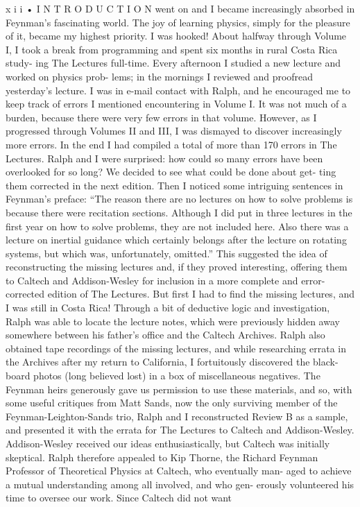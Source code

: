 \documentclass[10pt,oneside]{article}
\begin{document}
x i i • I N T R O D U C T I O N went on and I became increasingly absorbed in Feynman’s fascinating world. The joy of learning physics, simply for the pleasure of it, became my highest priority. I was hooked! About halfway through Volume I, I took a break from programming and spent six months in rural Costa Rica study- ing The Lectures full-time. Every afternoon I studied a new lecture and worked on physics prob- lems; in the mornings I reviewed and proofread yesterday’s lecture. I was in e-mail contact with Ralph, and he encouraged me to keep track of errors I mentioned encountering in Volume I. It was not much of a burden, because there were very few errors in that volume. However, as I progressed through Volumes II and III, I was dismayed to discover increasingly more errors. In the end I had compiled a total of more than 170 errors in The Lectures. Ralph and I were surprised: how could so many errors have been overlooked for so long? We decided to see what could be done about get- ting them corrected in the next edition. Then I noticed some intriguing sentences in Feynman’s preface: “The reason there are no lectures on how to solve problems is because there were recitation sections. Although I did put in three lectures in the first year on how to solve problems, they are not included here. Also there was a lecture on inertial guidance which certainly belongs after the lecture on rotating systems, but which was, unfortunately, omitted.” This suggested the idea of reconstructing the missing lectures and, if they proved interesting, offering them to Caltech and Addison-Wesley for inclusion in a more complete and error-corrected edition of The Lectures. But first I had to find the missing lectures, and I was still in Costa Rica! Through a bit of deductive logic and investigation, Ralph was able to locate the lecture notes, which were previously hidden away somewhere between his father’s office and the Caltech Archives. Ralph also obtained tape recordings of the missing lectures, and while researching errata in the Archives after my return to California, I fortuitously discovered the black- board photos (long believed lost) in a box of miscellaneous negatives. The Feynman heirs generously gave us permission to use these materials, and so, with some useful critiques from Matt Sands, now the only surviving member of the Feynman-Leighton-Sands trio, Ralph and I reconstructed Review B as a sample, and presented it with the errata for The Lectures to Caltech and Addison-Wesley. Addison-Wesley received our ideas enthusiastically, but Caltech was initially skeptical. Ralph therefore appealed to Kip Thorne, the Richard Feynman Professor of Theoretical Physics at Caltech, who eventually man- aged to achieve a mutual understanding among all involved, and who gen- erously volunteered his time to oversee our work. Since Caltech did not want\par
\end{document}
